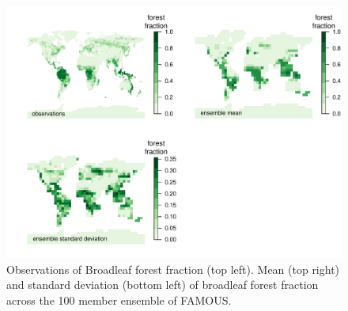 \documentclass[esd, manuscript]{copernicus}
\begin{document}




\begin{figure}[t]
\includegraphics[width=12cm]{graphics/BL_obs_ensemble_mean_sd.pdf}
\caption{Observations of Broadleaf forest fraction (top left). Mean (top right) and standard deviation (bottom left) of broadleaf forest fraction across the 100 member ensemble of FAMOUS.}
\label{fig:BL_obs_ensemble_mean_sd}
\end{figure}
\end{document}
